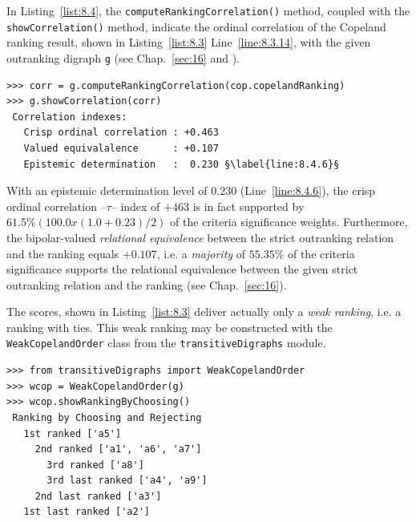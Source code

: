 In Listing~\vref{list:8.4}, the \texttt{computeRankingCorrelation()} method, coupled with the \texttt{showCorrelation()} method, indicate the ordinal correlation of the {\sc Cope\-land} ranking result, shown in Listing~\vref{list:8.3} Line~\ref{line:8.3.14}, with the given outranking digraph \texttt{g} (see Chap.~\ref{sec:16} and \citealp{BIS-2012a}).
\begin{lstlisting}[caption={Checking the ordinal quality of the \Copeland ranking},label=list:8.4]
>>> corr = g.computeRankingCorrelation(cop.copelandRanking)
>>> g.showCorrelation(corr)
 Correlation indexes:
   Crisp ordinal correlation : +0.463
   Valued equivalalence      : +0.107
   Epistemic determination   :  0.230 §\label{line:8.4.6}§
\end{lstlisting}

With an epistemic determination level of $0.230$ (Line~\vref{line:8.4.6}), the crisp ordinal correlation --\Kendall $\tau$-- index of $+463$ is in fact supported by $61.5\% (100.0 x (1.0 + 0.23)/2)$ of the criteria significance weights. Furthermore, the bipolar-valued \emph{relational equivalence} between the strict outranking relation and the \Copeland ranking equals $+0.107$, i.e. a \emph{majority} of $55.35\%$ of the criteria significance supports the relational equivalence between the given strict outranking relation and the \Copeland ranking (see Chap.~\ref{sec:16}).

The \Copeland scores, shown in Listing~\vref{list:8.3} deliver actually only a \emph{weak ranking}, i.e. a ranking with ties. This weak ranking may be constructed with the \texttt{WeakCopelandOrder} class  from the \texttt{transitiveDigraphs} module.
\begin{lstlisting}[caption={Computing a weak \Copeland ranking},label=list:8.5]
>>> from transitiveDigraphs import WeakCopelandOrder
>>> wcop = WeakCopelandOrder(g)
>>> wcop.showRankingByChoosing()
 Ranking by Choosing and Rejecting
   1st ranked ['a5']
     2nd ranked ['a1', 'a6', 'a7']
       3rd ranked ['a8']
       3rd last ranked ['a4', 'a9']
     2nd last ranked ['a3']
   1st last ranked ['a2']
\end{lstlisting}

